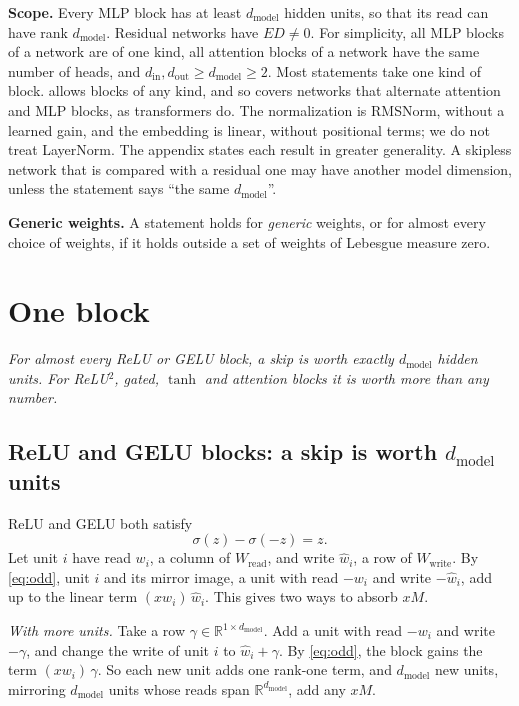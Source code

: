 \documentclass[10pt]{article}
\theoremstyle{definition}
\theoremstyle{remark}
\newcommand{\R}{\mathbb{R}}
\newcommand{\Wread}{W_{\mathrm{read}}}
\newcommand{\Wwrite}{W_{\mathrm{write}}}
\newcommand{\dm}{d_{\mathrm{model}}}
\newcommand{\para}[1]{\smallskip\noindent\textbf{#1}\hspace{0.5em}}
\newcommand{\takeaway}[1]{\noindent\textit{#1}\par\smallskip}
\begin{document}
\para{Scope.} Every MLP block has at least $\dm$ hidden units, so that its read can have rank $\dm$. Residual networks have $ED \neq 0$. For simplicity, all MLP blocks of a network are of one kind, all attention blocks of a network have the same number of heads, and $d_{\mathrm{in}}, d_{\mathrm{out}} \ge \dm \ge 2$. Most statements take one kind of block.  allows blocks of any kind, and so covers networks that alternate attention and MLP blocks, as transformers do. The normalization is RMSNorm, without a learned gain, and the embedding is linear, without positional terms; we do not treat LayerNorm. The appendix states each result in greater generality. A skipless network that is compared with a residual one may have another model dimension, unless the statement says ``the same $\dm$''.

\para{Generic weights.} A statement holds for \emph{generic} weights, or for almost every choice of weights, if it holds outside a set of weights of Lebesgue measure zero.

\section{One block}\label{sec:oneblock}
\takeaway{For almost every ReLU or GELU block, a skip is worth exactly $\dm$ hidden units. For ReLU$^2$, gated, $\tanh$ and attention blocks it is worth more than any number.}

\subsection{ReLU and GELU blocks: a skip is worth \texorpdfstring{$\dm$}{d\_model} units}\label{sec:relugelu}

ReLU and GELU both satisfy
\begin{equation}\label{eq:odd}
\sigma(z) - \sigma(-z) = z.
\end{equation}
Let unit $i$ have read $w_i$, a column of $\Wread$, and write $\hat w_i$, a row of $\Wwrite$. By \eqref{eq:odd}, unit $i$ and its mirror image, a unit with read $-w_i$ and write $-\hat w_i$, add up to the linear term $(xw_i)\,\hat w_i$. This gives two ways to absorb $xM$.

\emph{With more units.} Take a row $\gamma \in \R^{1\times\dm}$. Add a unit with read $-w_i$ and write $-\gamma$, and change the write of unit $i$ to $\hat w_i + \gamma$. By \eqref{eq:odd}, the block gains the term $(xw_i)\,\gamma$. So each new unit adds one rank-one term, and $\dm$ new units, mirroring $\dm$ units whose reads span $\R^{\dm}$, add any $xM$.
\end{document}
